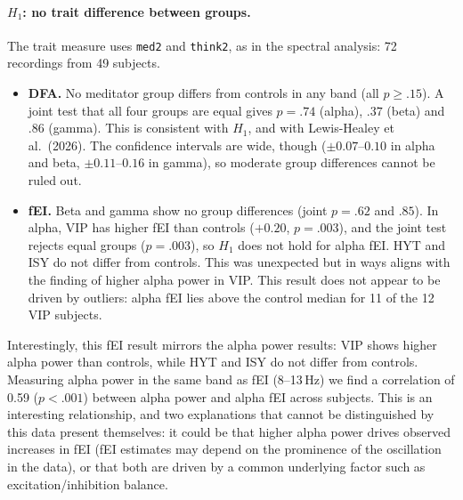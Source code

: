 \documentclass[10pt,a4paper]{article}
\begin{document}
\paragraph{$H_1$: no trait difference between groups.} The trait measure uses \texttt{med2} and \texttt{think2},
as in the spectral analysis: 72 recordings from 49 subjects.
\begin{itemize}
  \item \textbf{DFA.} No meditator group differs from controls in any band (all $p \ge .15$). A joint test that all
        four groups are equal gives $p = .74$ (alpha), $.37$ (beta) and $.86$ (gamma). This is consistent with $H_1$,
        and with Lewis-Healey et al.\ (2026). The confidence intervals are wide, though ($\pm 0.07$--$0.10$ in alpha
        and beta, $\pm 0.11$--$0.16$ in gamma), so moderate group differences cannot be ruled out.
  \item \textbf{fEI.} Beta and gamma show no group differences (joint $p = .62$ and $.85$). In alpha, VIP has
        higher fEI than controls ($+0.20$, $p = .003$), and the joint test rejects equal groups ($p = .003$), so
        $H_1$ does not hold for alpha fEI. HYT and ISY do not differ from controls. This was unexpected but
        in ways aligns with the finding of higher alpha power in VIP. This result does not appear to be
        driven by outliers: alpha fEI lies above the control median for 11 of the 12 VIP subjects.
\end{itemize}
Interestingly, this fEI result mirrors the alpha power results: VIP shows higher alpha power than controls, 
while HYT and ISY do not differ from controls. Measuring alpha power in the same band as fEI (8--13\,Hz) 
we find a correlation of 0.59 ($p < .001$) between alpha power and alpha fEI across subjects. This is an interesting
relationship, and two explanations that cannot be distinguished by this data present themselves: it could be 
that higher alpha power drives observed increases in fEI (fEI estimates may depend on the prominence 
of the oscillation in the data), 
or that both are driven by a common underlying factor such as excitation/inhibition balance.
\end{document}
